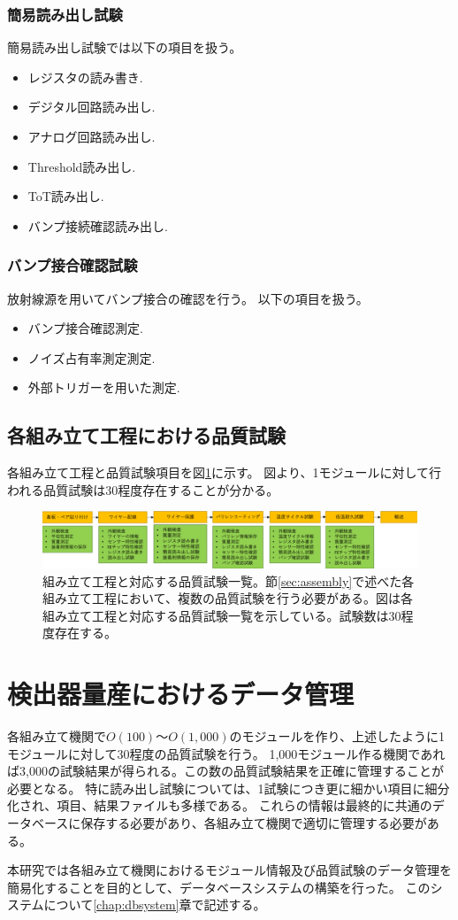 \subsubsection{簡易読み出し試験}
簡易読み出し試験では以下の項目を扱う。
\begin{itemize}
  \item レジスタの読み書き.
  \item デジタル回路読み出し.
  \item アナログ回路読み出し.
  \item Threshold読み出し.
  \item ToT読み出し.
  \item バンプ接続確認読み出し.
\end{itemize}

\subsubsection{バンプ接合確認試験}
放射線源を用いてバンプ接合の確認を行う。
以下の項目を扱う。
\begin{itemize}
  \item バンプ接合確認測定.
  \item ノイズ占有率測定測定.
  \item 外部トリガーを用いた測定.
\end{itemize}

\subsection{各組み立て工程における品質試験}

各組み立て工程と品質試験項目を図\ref{stage_test_flow}に示す。
図より、1モジュールに対して行われる品質試験は30程度存在することが分かる。

\begin{figure}[bpt]\centering
\includegraphics[width=15cm]{./stage_test_flow.png}
\caption[組み立て工程と対応する品質試験一覧]{組み立て工程と対応する品質試験一覧。節\ref{sec:assembly}で述べた各組み立て工程において、複数の品質試験を行う必要がある。図は各組み立て工程と対応する品質試験一覧を示している。試験数は30程度存在する。}
\label{stage_test_flow}
\end{figure}

\section{検出器量産におけるデータ管理}
各組み立て機関で$O(100)〜O(1,000)$のモジュールを作り、上述したように1モジュールに対して30程度の品質試験を行う。
1,000モジュール作る機関であれば3,000の試験結果が得られる。この数の品質試験結果を正確に管理することが必要となる。
特に読み出し試験については、1試験につき更に細かい項目に細分化され、項目、結果ファイルも多様である。
これらの情報は最終的に共通のデータベースに保存する必要があり、各組み立て機関で適切に管理する必要がある。

本研究では各組み立て機関におけるモジュール情報及び品質試験のデータ管理を簡易化することを目的として、データベースシステムの構築を行った。
このシステムについて\ref{chap:dbsystem}章で記述する。


